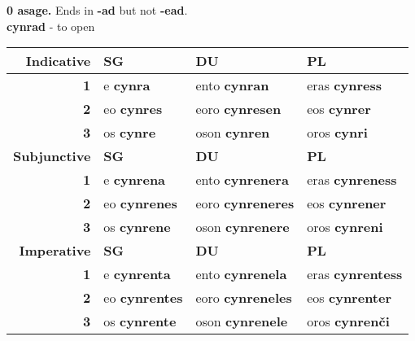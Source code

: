 \documentclass{book}
\begin{document}
\begin{center}
  \textbf{0 asage.} Ends in \textbf{-ad} but not \textbf{-ead}. \\
  \textbf{cynrad} - to open \\
  \begin{tabular}{|r|l|l|l|}
    \hline
    \textbf{Indicative} & \textbf{SG} & \textbf{DU} & \textbf{PL} \\ \hline
    \textbf{1} & e \textbf{cynra} & ento \textbf{cynran} & eras \textbf{cynress} \\ \hline
    \textbf{2} & eo \textbf{cynres} & eoro \textbf{cynresen} & eos \textbf{cynrer} \\ \hline
    \textbf{3} & os \textbf{cynre} & oson \textbf{cynren} & oros \textbf{cynri} \\ \hline
    \textbf{Subjunctive} & \textbf{SG} & \textbf{DU} & \textbf{PL} \\ \hline
    \textbf{1} & e \textbf{cynrena} & ento \textbf{cynrenera} & eras \textbf{cynreness} \\ \hline
    \textbf{2} & eo \textbf{cynrenes} & eoro \textbf{cynreneres} & eos \textbf{cynrener} \\ \hline
    \textbf{3} & os \textbf{cynrene} & oson \textbf{cynrenere} & oros \textbf{cynreni} \\ \hline
    \textbf{Imperative} & \textbf{SG} & \textbf{DU} & \textbf{PL} \\ \hline
    \textbf{1} & e \textbf{cynrenta} & ento \textbf{cynrenela} & eras \textbf{cynrentess} \\ \hline
    \textbf{2} & eo \textbf{cynrentes} & eoro \textbf{cynreneles} & eos \textbf{cynrenter} \\ \hline
    \textbf{3} & os \textbf{cynrente} & oson \textbf{cynrenele} & oros \textbf{cynrenči} \\ \hline
  \end{tabular}


\end{center}
\end{document}
